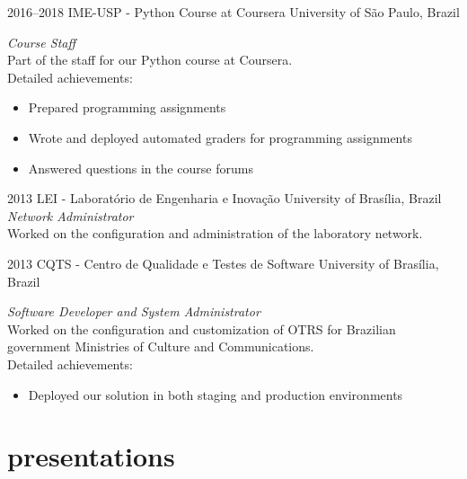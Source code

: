 \documentclass[print]{friggeri-cv}
\begin{document}
\begin{entrylist}

\entry
{2016--2018}
{IME-USP - Python Course at Coursera}
{University of São Paulo, Brazil}
{\emph{Course Staff} \\
Part of the staff for our Python course at Coursera. \\
Detailed achievements:
\begin{itemize}
  \item Prepared programming assignments
  \item Wrote and deployed automated graders for programming assignments
  \item Answered questions in the course forums
\end{itemize}}

\entry
{2013}
{LEI - Laboratório de Engenharia e Inovação}
{University of Brasília, Brazil}
{\emph{Network Administrator} \\
  Worked on the configuration and administration of the laboratory network. \\
}


\entry
{2013}
{CQTS - Centro de Qualidade e Testes de Software}
{University of Brasília, Brazil}
{\emph{Software Developer and System Administrator} \\
  Worked on the configuration and customization of OTRS for Brazilian
  government Ministries of Culture and Communications. \\
Detailed achievements:
\begin{itemize}
  \item Deployed our solution in both staging and production environments
\end{itemize}}

\end{entrylist}

\section{presentations}
\end{document}
